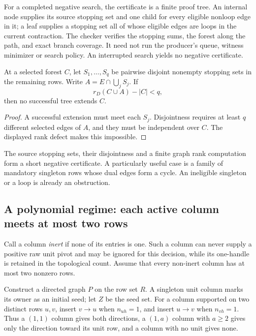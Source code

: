 For a completed negative search, the certificate is a finite proof tree.
An internal node supplies its source stopping set and one child for every
eligible nonloop edge in it; a leaf supplies a stopping set all of whose
eligible edges are loops in the current contraction.  The checker verifies
the stopping sums, the forest along the path, and exact branch coverage.
It need not run the producer's queue, witness minimizer or search policy.
An interrupted search yields no negative certificate.

\begin{proposition}
\label{prop:forest-rank-defect}
At a selected forest $C$, let $S_1,\ldots,S_q$ be pairwise disjoint
nonempty stopping sets in the remaining rows.  Write
$A=E\cap\bigcup_jS_j$.  If
\[
 r_D(C\cup A)-|C|<q,
\]
then no successful tree extends $C$.
\end{proposition}
\begin{proof}
A successful extension must meet each $S_j$.  Disjointness requires at
least $q$ different selected edges of $A$, and they must be independent
over $C$.  The displayed rank defect makes this impossible.
\end{proof}

The source stopping sets, their disjointness and a finite graph rank
computation form a short negative certificate.  A particularly useful
case is a family of mandatory singleton rows whose dual edges form a
cycle.  An ineligible singleton or a loop is already an obstruction.

\subsection{A polynomial regime: each active column meets at most two rows}

Call a column \emph{inert} if none of its entries is one.  Such a column
can never supply a positive raw unit pivot and may be ignored for this
decision, while its one-handle is retained in the topological count.
Assume that every non-inert column has at most two nonzero rows.

Construct a directed graph $P$ on the row set $R$.  A singleton unit
column marks its owner as an initial seed; let $Z$ be the seed set.  For
a column supported on two distinct rows $u,v$, insert $v\to u$ when
$n_{uh}=1$, and insert $u\to v$ when $n_{vh}=1$.  Thus a $(1,1)$ column
gives both directions, a $(1,a)$ column with $a\ge2$ gives only the
direction toward its unit row, and a column with no unit gives none.

